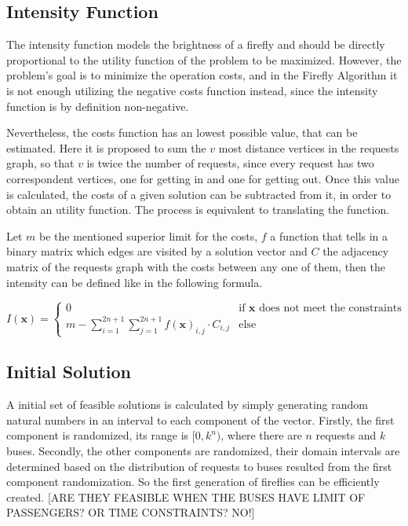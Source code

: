 \documentclass[tuberlin,cic,tc,openright,english,noabntcite,oneside]{iiufrgs}
\begin{document}
\subsection{Intensity Function}
The intensity function models the brightness of a firefly and should be directly proportional to the utility function of the problem to be maximized. However, the problem's goal is to minimize the operation costs, and in the Firefly Algorithm it is not enough utilizing the negative costs function instead, since the intensity function is by definition non-negative.

Nevertheless, the costs function has an lowest possible value, that can be estimated. Here it is proposed to sum the $v$ most distance vertices in the requests graph, so that $v$ is twice the number of requests, since every request has two correspondent vertices, one for getting in and one for getting out. Once this value is calculated, the costs of a given solution can be subtracted from it, in order to obtain an utility function. The process is equivalent to translating the function.

Let $m$ be the mentioned superior limit for the costs, $f$ a function that tells in a binary matrix which edges are visited by a solution vector and $C$ the adjacency matrix of the requests graph with the costs between any one of them, then the intensity can be defined like in the following formula.

$$I(\mathbf{x}) = \begin{cases} 0 & \text{if }\mathbf{x}\text{ does not meet the constraints}\\
								m - \displaystyle\sum_{i=1}^{2n+1}\sum_{j=1}^{2n+1} f(\mathbf{x})_{i,j} \cdot C_{i,j} & \text{else}
					\end{cases}$$

\subsection{Initial Solution}
A initial set of feasible solutions is calculated by simply generating random natural numbers in an interval to each component of the vector. Firstly, the first component is randomized, its range is $[0, k^n)$, where there are $n$ requests and $k$ buses. Secondly, the other components are randomized, their domain intervals are determined based on the distribution of requests to buses resulted from the first component randomization. So the first generation of fireflies can be efficiently created. [ARE THEY FEASIBLE WHEN THE BUSES HAVE LIMIT OF PASSENGERS? OR TIME CONSTRAINTS? NO!]
\end{document}
